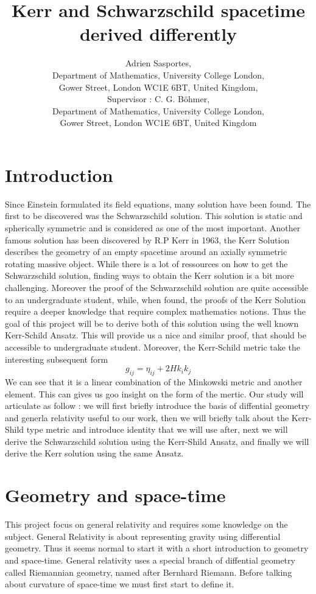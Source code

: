 \documentclass[a4paper,12pt]{article}
\title{Kerr and Schwarzschild spacetime derived differently}
\author{Adrien Sasportes,\\
Department of Mathematics, University College London, \\
Gower Street, London WC1E 6BT, United Kingdom,
\\ Supervisor : C. G. B\"ohmer,\\
Department of Mathematics, University College London, \\
Gower Street, London WC1E 6BT, United Kingdom
}
\theoremstyle{definition}
\begin{document}
\maketitle
{}
\newtheorem{definition}{Definition}

\section{Introduction}
Since Einstein formulated its field equations, many solution have been found.
The first to be discovered was the Schwarzschild solution.
This solution is static and spherically symmetric and is considered as one of the most important.
Another famous solution has been discovered by R.P Kerr in 1963, the Kerr Solution describes the geometry of an empty spacetime around an axially symmetric rotating massive object.
While there is a lot of ressources on how to get the Schwarzschild solution, finding ways to obtain the Kerr solution is a bit more challenging.
Moreover the proof of the Schwarzschild solution are quite accessible to an undergraduate student, while, when found, the proofs of the Kerr Solution require a deeper knowledge that require complex mathematics notions.
Thus the goal of this project will be to derive both of this solution using the well known Kerr-Schild Ansatz.
This will provide us a nice and similar proof, that should be accessible to undergraduate student.
Moreover, the Kerr-Schild metric take the interesting subsequent form 
\begin{equation*}
	g_{ij}=\eta_{ij}+2Hk_ik_j
\end{equation*}
We can see that it is a linear combination of the Minkowski metric and another element.
This can gives us goo insight on the form of the mertic.
Our study will articulate as follow : we will first briefly introduce the basis of diffential geometry and generla relativity useful to our work,
then we will briefly talk about the Kerr-Shild type metric and introduce identity that we will use after, next we will derive the Schwarzschild solution using the Kerr-Shild Ansatz,
and finally we will derive the Kerr solution using the same Ansatz.


\section{Geometry and space-time}
This project focus on general relativity and requires some knowledge on the subject.
General Relativity is about representing gravity using differential geometry.
Thus it seems normal to start it with a short introduction to geometry and space-time.
General relativity uses a special branch of diffential geometry called Riemannian geometry, named after Bernhard Riemann.
Before talking about curvature of space-time we must first start to define it.
\end{document}

